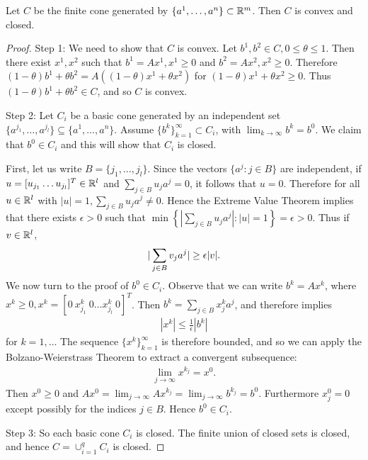 \begin{theorem}
Let $C$ be the finite cone generated by $\{ a^1, \dots, a^n \} \subset \mathbb{R}^m$.
Then $C$ is convex and closed.
\end{theorem}

\begin{proof}
Step 1:
We need to show that $C$ is convex.
Let $b^1, b^2 \in C, 0 \le \theta \le 1$.
Then there exist $x^1, x^2$ such that $b^1 = A x^1, x^1 \ge 0$ and $b^2 = A x^2, x^2 \ge 0$.
Therefore $(1-\theta)b^1 + \theta b^2 = A \left( (1-\theta) x^1 + \theta x^2 \right)$ for $(1-\theta) x^1 + \theta x^2 \ge 0$.
Thus $(1-\theta)b^1 + \theta b^2 \in C$, and so $C$ is convex.

Step 2:
Let $C_i$ be a basic cone generated by an independent set$\{ a^{j_1}, \dots, a^{j_l} \} \subseteq \{ a^1, \dots, a^n \}$.
Assume $\{ b^k \}_{k=1}^{\infty} \subset C_i$, with $\lim _{k \to \infty} b^k = b^0$.
We claim that $b^0 \in C_i$ and this will show that $C_i$ is closed.

First, let us write $B = \{ j_1, \dots, j_l \}$.
Since the vectors $\{ a^j : j \in B \}$ are independent, if $u = [u_{j_1} \dots u_{j_l}]^T \in \mathbb{R}^l$ and $\sum _{j \in B} u_j a^j = 0$, it follows that $u = 0$.
Therefore for all $u \in \mathbb{R}^l$ with $|u| = 1, \sum _{j \in B} u_j a^j \neq 0$.
Hence the Extreme Value Theorem implies that there exists $\epsilon > 0$ such that $\min \left\{ |\sum _{j \in B} u_j a^j| : |u| = 1 \right\} = \epsilon > 0$.
Thus if $v \in \mathbb{R}^l$, 
\begin{align}
|\sum _{j \in B} v_j a^j| \ge \epsilon |v|. \labeq{proof_convex_closed_eq_1}
\end{align}
We now turn to the proof of $b^0 \in C_i$.
Observe that we can write $b^k = A x^k$, where $x^k \ge 0, x^k = [0 \ x_{j_1}^k \ 0 \dots x_{j_l}^k \ 0]^T$.
Then $b^k = \sum _{j \in B} x_j^k a^j$, and therefore  implies 
\begin{align}
|x^k| \le \frac{1}{\epsilon} |b^k|
\end{align}
for $k=1, \dots$
The sequence $\{ x^k \}_{k=1}^{\infty}$ is therefore bounded, and so we can apply the Bolzano-Weierstrass Theorem to extract a convergent subsequence:
\begin{align}
\lim _{j \to \infty} x^{k_j} = x^0.
\end{align}
Then $x^0 \ge 0$ and $A x^0 = \lim _{j \to \infty} A x^{k_j} = \lim _{j \to \infty} b^{k_j} = b^0$.
Furthermore $x_j^0 = 0$ except possibly for the indices $j \in B$.
Hence $b^0 \in C_i$.

Step 3:
So each basic cone $C_i$ is closed.
The finite union of closed sets is closed, and hence $C = \cup _{i=1}^{q} C_i$ is closed.
\end{proof}

